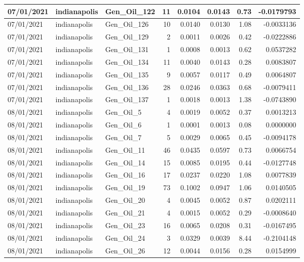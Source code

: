 \documentclass[
  letterpaper,
  DIV=11,
  numbers=noendperiod]{scrartcl}
\begin{document}
\begin{tabular}{l|l|l|r|r|r|r|r}
\hline
07/01/2021 & indianapolis & Gen\_Oil\_122 & 11 & 0.0104 & 0.0143 & 0.73 & -0.0179793\\
\hline
07/01/2021 & indianapolis & Gen\_Oil\_126 & 10 & 0.0140 & 0.0130 & 1.08 & -0.0033136\\
\hline
07/01/2021 & indianapolis & Gen\_Oil\_129 & 2 & 0.0011 & 0.0026 & 0.42 & -0.0222886\\
\hline
07/01/2021 & indianapolis & Gen\_Oil\_131 & 1 & 0.0008 & 0.0013 & 0.62 & 0.0537282\\
\hline
07/01/2021 & indianapolis & Gen\_Oil\_134 & 11 & 0.0040 & 0.0143 & 0.28 & 0.0083807\\
\hline
07/01/2021 & indianapolis & Gen\_Oil\_135 & 9 & 0.0057 & 0.0117 & 0.49 & 0.0064807\\
\hline
07/01/2021 & indianapolis & Gen\_Oil\_136 & 28 & 0.0246 & 0.0363 & 0.68 & -0.0079411\\
\hline
07/01/2021 & indianapolis & Gen\_Oil\_137 & 1 & 0.0018 & 0.0013 & 1.38 & -0.0743890\\
\hline
08/01/2021 & indianapolis & Gen\_Oil\_5 & 4 & 0.0019 & 0.0052 & 0.37 & 0.0013213\\
\hline
08/01/2021 & indianapolis & Gen\_Oil\_6 & 1 & 0.0001 & 0.0013 & 0.08 & 0.0000000\\
\hline
08/01/2021 & indianapolis & Gen\_Oil\_7 & 5 & 0.0029 & 0.0065 & 0.45 & -0.0094178\\
\hline
08/01/2021 & indianapolis & Gen\_Oil\_11 & 46 & 0.0435 & 0.0597 & 0.73 & 0.0066754\\
\hline
08/01/2021 & indianapolis & Gen\_Oil\_14 & 15 & 0.0085 & 0.0195 & 0.44 & -0.0127748\\
\hline
08/01/2021 & indianapolis & Gen\_Oil\_16 & 17 & 0.0237 & 0.0220 & 1.08 & 0.0077839\\
\hline
08/01/2021 & indianapolis & Gen\_Oil\_19 & 73 & 0.1002 & 0.0947 & 1.06 & 0.0140505\\
\hline
08/01/2021 & indianapolis & Gen\_Oil\_20 & 4 & 0.0045 & 0.0052 & 0.87 & 0.0202111\\
\hline
08/01/2021 & indianapolis & Gen\_Oil\_21 & 4 & 0.0015 & 0.0052 & 0.29 & -0.0008640\\
\hline
08/01/2021 & indianapolis & Gen\_Oil\_23 & 16 & 0.0065 & 0.0208 & 0.31 & -0.0167495\\
\hline
08/01/2021 & indianapolis & Gen\_Oil\_24 & 3 & 0.0329 & 0.0039 & 8.44 & -0.2104148\\
\hline
08/01/2021 & indianapolis & Gen\_Oil\_26 & 12 & 0.0044 & 0.0156 & 0.28 & 0.0154999\\

\end{tabular}
\end{document}
